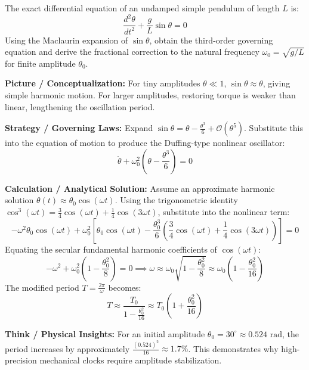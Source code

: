\begin{psctexample}
The exact differential equation of an undamped simple pendulum of length $L$ is:
\begin{equation}
\frac{d^2\theta}{dt^2} + \frac{g}{L}\sin\theta = 0
\end{equation}
Using the Maclaurin expansion of $\sin\theta$, obtain the third-order governing equation and derive the fractional correction to the natural frequency $\omega_0 = \sqrt{g/L}$ for finite amplitude $\theta_0$.

\textbf{\color{rbruNavy}Picture / Conceptualization:}
For tiny amplitudes $\theta \ll 1$, $\sin\theta \approx \theta$, giving simple harmonic motion. For larger amplitudes, restoring torque is weaker than linear, lengthening the oscillation period.

\textbf{\color{rbruNavy}Strategy / Governing Laws:}
Expand $\sin\theta = \theta - \frac{\theta^3}{6} + \mathcal{O}(\theta^5)$. Substitute this into the equation of motion to produce the Duffing-type nonlinear oscillator:
\begin{equation}
\ddot{\theta} + \omega_0^2\left(\theta - \frac{\theta^3}{6}\right) = 0
\end{equation}

\textbf{\color{rbruNavy}Calculation / Analytical Solution:}
Assume an approximate harmonic solution $\theta(t) \approx \theta_0\cos(\omega t)$. 
Using the trigonometric identity $\cos^3(\omega t) = \frac{3}{4}\cos(\omega t) + \frac{1}{4}\cos(3\omega t)$, substitute into the nonlinear term:
\begin{equation}
-\omega^2\theta_0\cos(\omega t) + \omega_0^2\left[\theta_0\cos(\omega t) - \frac{\theta_0^3}{6}\left(\frac{3}{4}\cos(\omega t) + \frac{1}{4}\cos(3\omega t)\right)\right] = 0
\end{equation}
Equating the secular fundamental harmonic coefficients of $\cos(\omega t)$:
\begin{equation}
-\omega^2 + \omega_0^2\left(1 - \frac{\theta_0^2}{8}\right) = 0 \implies \omega \approx \omega_0\sqrt{1 - \frac{\theta_0^2}{8}} \approx \omega_0\left(1 - \frac{\theta_0^2}{16}\right)
\end{equation}
The modified period $T = \frac{2\pi}{\omega}$ becomes:
\begin{equation}
T \approx \frac{T_0}{1 - \frac{\theta_0^2}{16}} \approx T_0\left(1 + \frac{\theta_0^2}{16}\right)
\end{equation}

\textbf{\color{rbruNavy}Think / Physical Insights:}
For an initial amplitude $\theta_0 = 30^\circ \approx 0.524\text{ rad}$, the period increases by approximately $\frac{(0.524)^2}{16} \approx 1.7\%$. This demonstrates why high-precision mechanical clocks require amplitude stabilization.
\qedexam
\end{psctexample}

